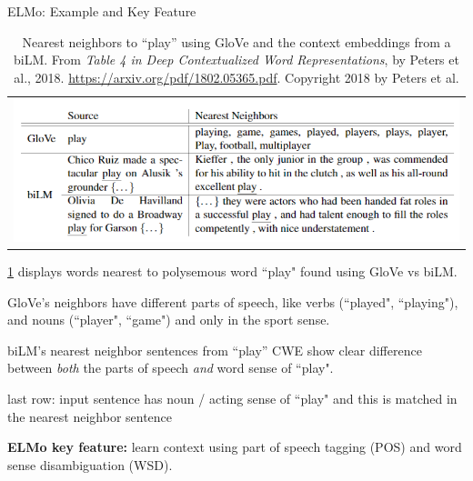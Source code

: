 \begin{frame}{ELMo: Example and Key Feature}
    
    
    
    \begin{table}[ht!]
      \centering
      \begin{tabular}{ c }
        
        \begin{minipage}{.9\textwidth}
          \includegraphics[width=\linewidth]{imgs/table_elmoPlay.png}
        \end{minipage}
        \vspace{-7pt}
      \end{tabular}
      \caption{\linespread{0.3} \scriptsize Nearest neighbors to ``play” using GloVe and the context embeddings from a biLM. From \emph{Table 4 in Deep Contextualized Word Representations}, by Peters et al., 2018. \url{https://arxiv.org/pdf/1802.05365.pdf}. Copyright 2018 by Peters et al.}
      \label{tbl:elmoPlayExample}
      \vspace{-10pt}
    \end{table}
    
    
    {\linespread{0.3}
    \begin{itemizeSpaced}{4pt}
        
        \item \cref{tbl:elmoPlayExample} displays words nearest to polysemous word ``play" found using GloVe vs biLM. 
        
        \pinkbox GloVe's neighbors have different parts of speech, like verbs (``played", ``playing"), and nouns (``player", ``game") and only in the sport sense.
        
        
        \pinkbox biLM's nearest neighbor sentences from ``play'' CWE show clear difference between \emph{both} the parts of speech \emph{and} word sense of ``play". 
        
        \begin{itemizeSpaced}{0pt}
            \pinkbox last row: input sentence has noun / acting sense of ``play" and this is matched in the nearest neighbor sentence
        \end{itemizeSpaced}        
            
    
    \end{itemizeSpaced} }
    
    \textbf{ELMo key feature: } learn context using part of speech tagging (POS) and word sense disambiguation (WSD).  
    
\end{frame}